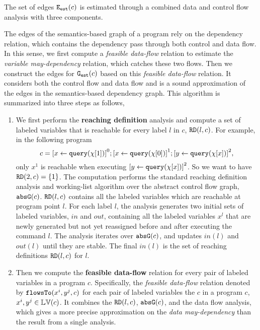 The set of edges $\mathtt{{E_{est}}}(c)$ is estimated through a combined data and control flow analysis with three components.

The edges of the semantics-based graph of a program rely on the dependency relation,
which contains the dependency pass through both control and data flow. 
In this sense, we first compute a \emph{feasible data-flow} relation to estimate the \emph{variable may-dependency} relation, which catches these two flows.
Then we construct the edges for $\mathtt{{G_{est}}}(c)$ based on this \emph{feasible data-flow} relation.
It 
considers both the control flow and data flow and
is a sound approximation of the edges in the semantics-based dependency graph.
This algorithm is summarized into three steps as follows,
\begin{enumerate}
 \item 
 We first perform the \textbf{reaching definition} analysis and compute a set of labeled variables that is reachable for every label $l$ in $c$, $\mathtt{RD}(l, c)$.
 For example, in the following program
 \[
 c = \clabel{\assign{x}{\query(\chi[1])}}^0 ;\clabel{\assign{x}{\query(\chi[0])}}^1 ;
 \clabel{\assign{y}{\query(\chi[x])}}^2,
 \]
 only $x^1$ is reachable when executing $\clabel{\assign{y}{\query(\chi[x])}}^2$.
 So we want to have $\mathtt{RD}(2, c) = \{1\}$.
The computation performs the standard reaching definition analysis and working-list algorithm over the abstract control flow graph, $\mathtt{abs}{\mathtt{G}}(c)$. 
 $\mathtt{RD}(l, c)$ contains all the labeled variables which are reachable at program point $l$. 
 For each label $l$, the analysis generates two initial sets of labeled variables, $in$ and $out$, 
 containing all the labeled variables $x^l$ that are newly generated but not yet reassigned before and after executing the command $l$.
 The analysis iterates over $\mathtt{abs}{\mathtt{G}}(c)$, and updates $in(l)$ and $out(l)$ until they are stable.
 The final $in(l)$ is the set of reaching definitions $\mathtt{RD}(l, c)$ for $l$. 
 \item 
 Then we compute the \textbf{feasible data-flow} relation
 for every pair of labeled variables in a program $c$.
 Specifically, the \emph{feasible data-flow} relation denoted by
 $\mathtt{flowsTo}(x^i, y^j, c)$ for each pair of labeled variables the $c$ in a program $c$, $x^i, y^j \in \mathbb{LV}(c)$.
 It combines the $\mathtt{RD}(l, c)$, $\mathtt{abs}{\mathtt{G}}(c)$, and the data flow analysis, which gives a more precise approximation on the \emph{data may-dependency} than the result from a single analysis.

\end{enumerate}
